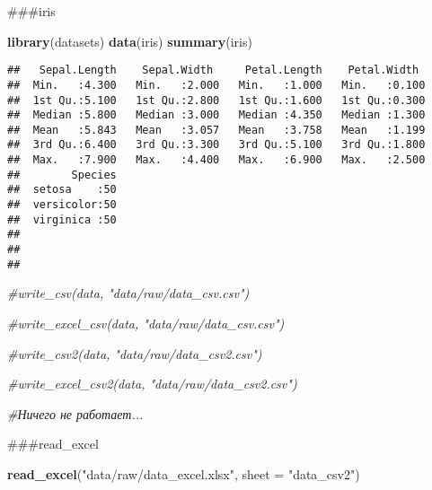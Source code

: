 \documentclass[
]{article}
\newenvironment{Shaded}{\begin{snugshade}}{\end{snugshade}}
\newcommand{\AttributeTok}[1]{\textcolor[rgb]{0.13,0.29,0.53}{#1}}
\newcommand{\CommentTok}[1]{\textcolor[rgb]{0.56,0.35,0.01}{\textit{#1}}}
\newcommand{\FunctionTok}[1]{\textcolor[rgb]{0.13,0.29,0.53}{\textbf{#1}}}
\newcommand{\NormalTok}[1]{#1}
\newcommand{\StringTok}[1]{\textcolor[rgb]{0.31,0.60,0.02}{#1}}
\begin{document}
\#\#\#iris

\begin{Shaded}
\begin{Highlighting}[]
\FunctionTok{library}\NormalTok{(datasets)}
\FunctionTok{data}\NormalTok{(iris)}
\FunctionTok{summary}\NormalTok{(iris)}
\end{Highlighting}
\end{Shaded}

\begin{verbatim}
##   Sepal.Length    Sepal.Width     Petal.Length    Petal.Width   
##  Min.   :4.300   Min.   :2.000   Min.   :1.000   Min.   :0.100  
##  1st Qu.:5.100   1st Qu.:2.800   1st Qu.:1.600   1st Qu.:0.300  
##  Median :5.800   Median :3.000   Median :4.350   Median :1.300  
##  Mean   :5.843   Mean   :3.057   Mean   :3.758   Mean   :1.199  
##  3rd Qu.:6.400   3rd Qu.:3.300   3rd Qu.:5.100   3rd Qu.:1.800  
##  Max.   :7.900   Max.   :4.400   Max.   :6.900   Max.   :2.500  
##        Species  
##  setosa    :50  
##  versicolor:50  
##  virginica :50  
##                 
##                 
## 
\end{verbatim}

\begin{Shaded}
\begin{Highlighting}[]
\CommentTok{\#write\_csv(data, "data/raw/data\_csv.csv")}

\CommentTok{\#write\_excel\_csv(data, "data/raw/data\_csv.csv")}

\CommentTok{\#write\_csv2(data, "data/raw/data\_csv2.csv")}

\CommentTok{\#write\_excel\_csv2(data, "data/raw/data\_csv2.csv")}

\CommentTok{\#Ничего не работает...}
\end{Highlighting}
\end{Shaded}

\#\#\#read\_excel

\begin{Shaded}
\begin{Highlighting}[]
\FunctionTok{read\_excel}\NormalTok{(}\StringTok{"data/raw/data\_excel.xlsx"}\NormalTok{, }\AttributeTok{sheet =} \StringTok{"data\_csv2"}\NormalTok{)}
\end{Highlighting}
\end{Shaded}
\end{document}
